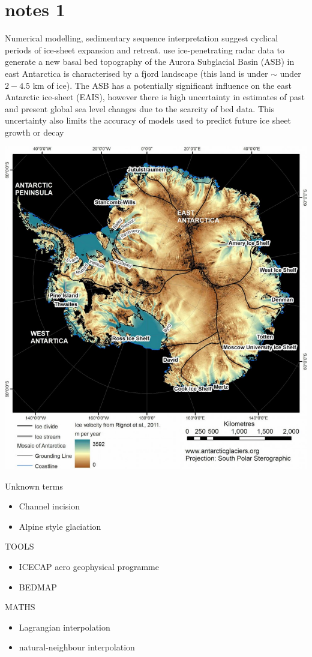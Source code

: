 \chapter{notes 1}\label{n1}

Numerical modelling, sedimentary sequence interpretation suggest cyclical periods of ice-sheet expansion and retreat\cite{Young2011}. 
use ice-penetrating radar data to generate a new basal bed topography of the Aurora Subglacial Basin (ASB) in east Antarctica is characterised by a fjord landscape (this land is under $\sim$ under $2-4.5$ km of ice). The ASB has a potentially significant influence on the east Antarctic ice-sheet (EAIS), however there is high uncertainty in estimates of past and present global sea level changes due to the scarcity of bed data\cite{Young2011}. This uncertainty also limits the accuracy of models used to predict future ice sheet growth or decay

\begin{Figure}
\centering
\includegraphics[width=1.4\linewidth]{antarctica_velocity.pdf}
\label{fig:Antarctica_velocity}
\end{Figure}

Unknown terms
{\small \begin{itemize}
\item{Channel incision}
\item{Alpine style glaciation}
\end{itemize}
}

TOOLS
{\small \begin{itemize}
\item{ICECAP aero geophysical programme}
\item{BEDMAP}
\end{itemize}
}

MATHS
{\small \begin{itemize}
\item{Lagrangian interpolation}
\item{natural-neighbour interpolation}
\end{itemize}
}

